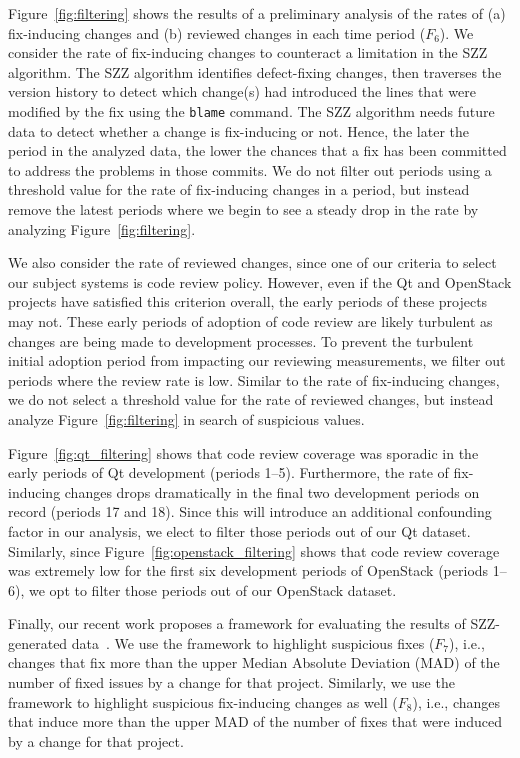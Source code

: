 Figure~\ref{fig:filtering} shows the results of a preliminary analysis of the rates of (a) fix-inducing changes and (b) reviewed changes in each time period ($F_6$).
We consider the rate of fix-inducing changes to counteract a limitation in the SZZ algorithm. 
The SZZ algorithm identifies defect-fixing changes, then traverses the version history to detect which change(s) had introduced the lines that were modified by the fix using the {\tt blame} command.
The SZZ algorithm needs future data to detect whether a change is fix-inducing or not.
Hence, the later the period in the analyzed data, the lower the chances that a fix has been committed to address the problems in those commits.
We do not filter out periods using a threshold value for the rate of fix-inducing changes in a period, but instead remove the latest periods where we begin to see a steady drop in the rate by analyzing Figure~\ref{fig:filtering}.

We also consider the rate of reviewed changes, since one of our criteria to select our subject systems is code review policy. However, even if the {\sc Qt} and {\sc OpenStack} projects have satisfied this criterion overall, the early periods of these projects may not.
These early periods of adoption of code review are likely turbulent as changes are being made to development processes.
To prevent the turbulent initial adoption period from impacting our reviewing measurements, we filter out periods where the review rate is low. 
Similar to the rate of fix-inducing changes, we do not select a threshold value for the rate of reviewed changes, but instead analyze Figure~\ref{fig:filtering} in search of suspicious values.

Figure~\ref{fig:qt_filtering} shows that code review coverage was sporadic in the early periods of {\sc Qt} development (periods 1--5).
Furthermore, the rate of fix-inducing changes drops dramatically in the final two development periods on record (periods 17 and 18).
Since this will introduce an additional confounding factor in our analysis, we elect to filter those periods out of our {\sc Qt} dataset.
Similarly, since Figure~\ref{fig:openstack_filtering} shows that code review coverage was extremely low for the first six development periods of {\sc OpenStack} (periods 1--6), we opt to filter those periods out of our {\sc OpenStack} dataset.

Finally, our recent work proposes a framework for evaluating the results of SZZ-generated data~\cite{costa2017tse}.
We use the framework to highlight suspicious fixes ($F_7$), i.e., changes that fix more than the upper Median Absolute Deviation (MAD) of the number of fixed issues by a change for that project.
Similarly, we use the framework to highlight suspicious fix-inducing changes as well ($F_8$), i.e., changes that induce more than the upper MAD of the number of fixes that were induced by a change for that project.

